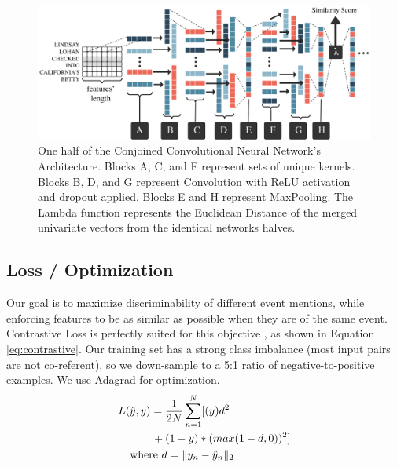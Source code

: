\documentclass[11pt,a4paper]{article}
\begin{document}
\begin{figure}[h]
\centering
	\includegraphics[width=1\textwidth]{architecture.pdf}
	\caption{One half of the Conjoined Convolutional Neural Network's Architecture.  Blocks A, C, and F represent sets of unique kernels.  Blocks B, D, and G represent Convolution with ReLU activation and dropout applied.  Blocks E and H represent MaxPooling.  The Lambda function represents the Euclidean Distance of the merged univariate vectors from the identical networks halves.}
	\label{fig:ccnn}
\end{figure}

\subsection{Loss / Optimization}
Our goal is to maximize discriminability of different event mentions, while enforcing features to be as similar as possible when they are of the same event.  Contrastive Loss is perfectly suited for this objective \cite{SchroffKP15,pmlr-v48-liud16}, as shown in Equation \ref{eq:contrastive}. Our training set has a strong class imbalance (most input pairs are not co-referent), so we down-sample to a 5:1 ratio of negative-to-positive examples.  We use Adagrad for optimization.
\begin{equation}
\begin{aligned}
L(&\hat{y},y)=\frac{1}{2N}\sum_{n=1}^{N}[(y)d^2 \\
&\qquad {} + (1-y)*(max(1-d,0))^2] \\
&\textnormal{where }d=\|y_{n}-\hat{y}_{n}\|_{2}
\end{aligned}
\label{eq:contrastive}
\end{equation}
\end{document}
